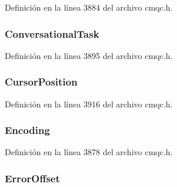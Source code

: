 Definición en la línea 3884 del archivo cmqc.\+h.

\hypertarget{structtag_m_q_c_i_h_a9b0ba04873b6525850fca56130f09d15}{}
\subsubsection[{Conversational\+Task}]{ Conversational\+Task}\label{structtag_m_q_c_i_h_a9b0ba04873b6525850fca56130f09d15}


Definición en la línea 3895 del archivo cmqc.\+h.

\hypertarget{structtag_m_q_c_i_h_a15ad05af670b776138fd8276c3104af3}{}
\subsubsection[{Cursor\+Position}]{ Cursor\+Position}\label{structtag_m_q_c_i_h_a15ad05af670b776138fd8276c3104af3}


Definición en la línea 3916 del archivo cmqc.\+h.

\hypertarget{structtag_m_q_c_i_h_a30167bf454a49a60fd3fe4e9e586af34}{}
\subsubsection[{Encoding}]{ Encoding}\label{structtag_m_q_c_i_h_a30167bf454a49a60fd3fe4e9e586af34}


Definición en la línea 3878 del archivo cmqc.\+h.

\hypertarget{structtag_m_q_c_i_h_ab1e33f3c4d4f7bffa21cae8adbdf4c74}{}
\subsubsection[{Error\+Offset}]{ Error\+Offset}\label{structtag_m_q_c_i_h_ab1e33f3c4d4f7bffa21cae8adbdf4c74}


